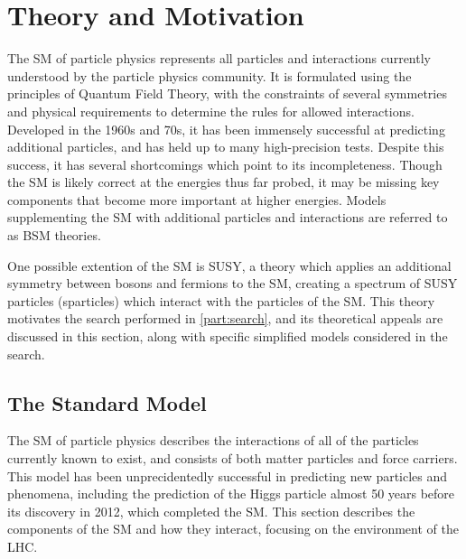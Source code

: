 
\chapter{Theory and Motivation} %

\label{ch:theory} %
The \ac{SM} of particle physics represents all particles and interactions currently understood by the particle physics community. It is formulated using the principles of Quantum Field Theory, with the constraints of several symmetries and physical requirements to determine the rules for allowed interactions. \cite{Burgess:2007zi} Developed in the 1960s and 70s, it has been immensely successful at predicting additional particles, and has held up to many high-precision tests. Despite this success, it has several shortcomings which point to its incompleteness. Though the \ac{SM} is likely correct at the energies thus far probed, it may be missing key components that become more important at higher energies. Models supplementing the \ac{SM} with additional particles and interactions are referred to as \ac{BSM} theories. 

One possible extention of the \ac{SM} is \ac{SUSY}, a theory which applies an additional symmetry between bosons and fermions to the \ac{SM}, creating a spectrum of \ac{SUSY} particles (sparticles) which interact with the particles of the \ac{SM}. This theory motivates the search performed in \autoref{part:search}, and its theoretical appeals are discussed in this section, along with specific simplified models considered in the search. 


\section{The Standard Model}
\label{sec:standard_model}
The \ac{SM} of particle physics describes the interactions of all of the particles currently known to exist, and consists of both matter particles and force carriers. This model has been unprecidentedly successful in predicting new particles and phenomena, including the prediction of the Higgs particle almost 50 years before its discovery in 2012, which completed the \ac{SM}. This section describes the components of the \ac{SM} and how they interact, focusing on the environment of the \ac{LHC}. 

